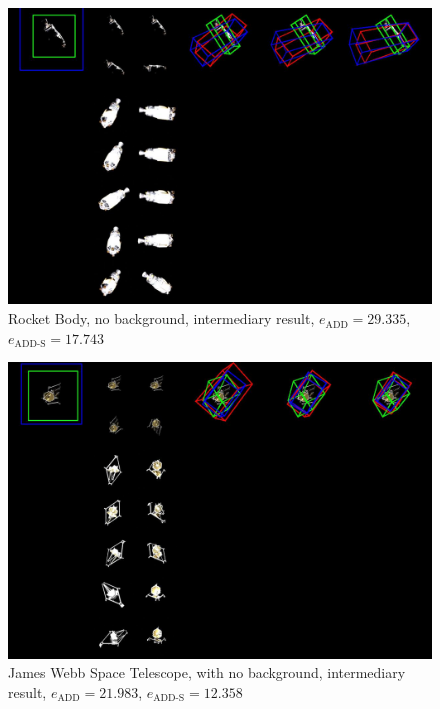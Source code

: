 \begin{figure}[ht]
  \centering
  \includegraphics[width=\textwidth]{data/fig14.jpg}
  \caption{Rocket Body, no background, intermediary result, $e_\mathrm{ADD}=29.335$, $e_{\mathrm{ADD}\text{-}\mathrm{S}}=17.743$}
  \label{fig:cap1}
\end{figure}

\begin{figure}[ht]
  \centering
  \includegraphics[width=\textwidth]{data/fig15.jpg}
  \caption{James Webb Space Telescope, with no background, intermediary result, $e_\mathrm{ADD}=21.983$, $e_{\mathrm{ADD}\text{-}\mathrm{S}}=12.358$}
  \label{fig:cap1}
\end{figure}


